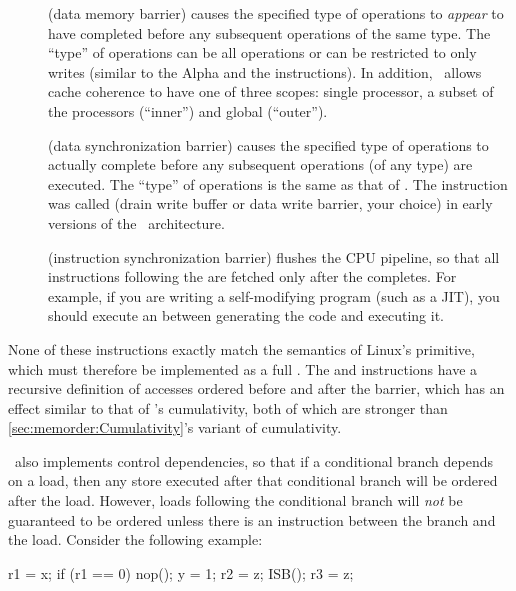 \begin{description}
\item	[] (data memory barrier) causes the specified type of
	operations to \emph{appear} to have completed before any
	subsequent operations of the same type.
	The ``type'' of operations can be all operations or can be
	restricted to only writes (similar to the Alpha 
	and the \Power{}  instructions).
	In addition, \ARM\ allows cache coherence to have one of three
	scopes: single processor, a subset of the processors
	(``inner'') and global (``outer'').
\item	[] (data synchronization barrier) causes the specified
	type of operations to actually complete before any subsequent
	operations (of any type) are executed.
	The ``type'' of operations is the same as that of .
	The  instruction was called  (drain write buffer
	or data write barrier, your choice) in early versions of the
	\ARM\ architecture.
\item	[] (instruction synchronization barrier) flushes the CPU
	pipeline, so that all instructions following the 
	are fetched only after the  completes.
	For example, if you are writing a self-modifying program
	(such as a JIT), you should execute an  between
	generating the code and executing it.
\end{description}

None of these instructions exactly match the semantics of Linux's
 primitive, which must therefore be implemented as a full
.
The  and  instructions have a recursive definition
of accesses ordered before and after the barrier, which has an effect
similar to that of \Power{}'s cumulativity, both of which are
stronger than
\cref{sec:memorder:Cumulativity}'s
variant of cumulativity.

\ARM\ also implements control dependencies, so that if a conditional
branch depends on a load, then any store executed after that conditional
branch will be ordered after the load.
However, loads following the conditional branch will \emph{not}
be guaranteed to be ordered unless there is an 
instruction between the branch and the load.
Consider the following example:

\begin{fcvlabel}
\begin{VerbatimN}[commandchars=\\\[\]]
r1 = x;			\lnlbl[x]
if (r1 == 0)		\lnlbl[if]
	nop();		\lnlbl[nop]
y = 1;			\lnlbl[y]
r2 = z;			\lnlbl[z1]
ISB();			\lnlbl[isb]
r3 = z;			\lnlbl[z2]
\end{VerbatimN}
\end{fcvlabel}

